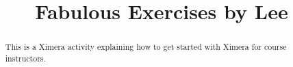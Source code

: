 \documentclass{xourse}
\title{Fabulous Exercises by Lee}%
\begin{document}
\begin{abstract} %

This is a Ximera activity explaining how to get started with Ximera for course instructors.

\end{abstract}

\maketitle


\end{document}
